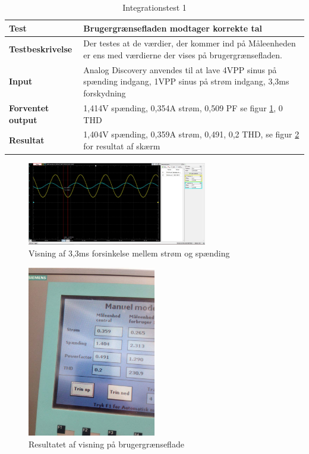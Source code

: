 \begin{table}
	\begin{tabular}{ | m{} | m{}|} 
		\hline
		\textbf{Test}					&Brugergrænsefladen modtager korrekte tal \\ \hline
		\textbf{Testbeskrivelse}		&Der testes at de værdier, der kommer ind på Måleenheden er ens med værdierne der vises på brugergrænsefladen. \\ \hline
		\textbf{Input}					&Analog Discovery anvendes til at lave 4VPP sinus på spænding indgang, 1VPP sinus på strøm indgang, 3,3ms forskydning \\ \hline
		\textbf{Forventet output}		&1,414V spænding, 0,354A strøm, 0,509 PF se figur \ref{fig:PFtest1}, 0 THD \\ \hline
		\textbf{Resultat}				&1,404V spænding, 0,359A strøm, 0,491, 0,2 THD,  se figur \ref*{fig:visningtest1} for resultat af skærm  \\ \hline
	\end{tabular}
	\caption{Integrationstest 1} 
\label{tab:int test 1} 
\end{table}

\begin{figure}[H] %
	\centering
	\includegraphics[width=0.7\textwidth]{Test/PFTest1}
	\caption{Visning af 3,3ms forsinkelse mellem strøm og spænding}
	\label{fig:PFtest1}
\end{figure}

\begin{figure}[H] %
	\centering
	\includegraphics[width=0.5\textwidth]{Test/Visningstest1}
	\caption{Resultatet af visning på brugergrænseflade}
	\label{fig:visningtest1}
\end{figure}


